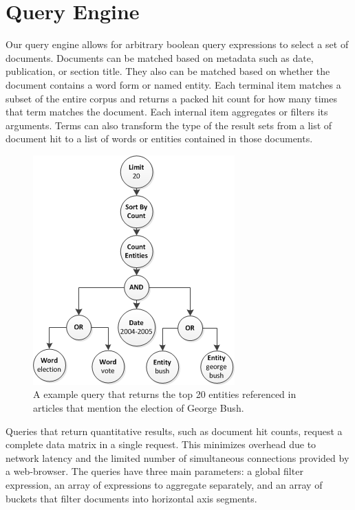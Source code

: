 \section{Query Engine}
Our query engine allows for arbitrary boolean query expressions to select a set of documents.  Documents can be matched based on metadata such as date, publication, or section title. They also can be matched based on whether the document contains a word form or named entity.  Each terminal item matches a subset of the entire corpus and returns a packed hit count for how many times that term matches the document.  Each internal item aggregates or filters its arguments.  Terms can also transform the type of the result sets from a list of document hit to a list of words or entities contained in those documents.

\begin{figure}[htb]
  \centerline{
    \includegraphics[scale=0.28]{figures/entity-query.png}
  }
  \caption{A example query that returns the top 20 entities referenced in articles that mention the election of George Bush.}
  \label{fig:entity-query}
\end{figure}

Queries that return quantitative results, such as document hit counts, request a complete data matrix in a single request.  This minimizes overhead due to network latency and the limited number of simultaneous connections provided by a web-browser.  The queries have three main parameters: a global filter expression, an array of expressions to aggregate separately, and an array of buckets that filter documents into horizontal axis segments.

